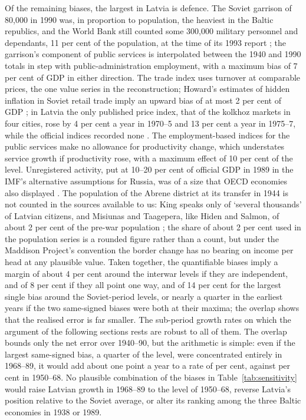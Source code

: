 Of the remaining biases, the largest in Latvia is defence. The Soviet garrison of 80,000 in 1990 was, in proportion to population, the heaviest in the Baltic republics, and the World Bank still counted some 300,000 military personnel and dependants, 11 per cent of the population, at the time of its 1993 report \parencite[157]{wbtransitionlatv}; the garrison's component of public services is interpolated between the 1940 and 1990 totals in step with public-administration employment, with a maximum bias of 7 per cent of GDP in either direction. The trade index uses turnover at comparable prices, the one value series in the reconstruction; Howard's estimates of hidden inflation in Soviet retail trade imply an upward bias of at most 2 per cent of GDP \parencites[607]{hidden_inflation_sov}[688--9]{kontorovich_2001}; in Latvia the only published price index, that of the kolkhoz markets in four cities, rose by 4 per cent a year in 1970--5 and 13 per cent a year in 1975--7, while the official indices recorded none \parencite[221]{years_of_dependence}. The employment-based indices for the public services make no allowance for productivity change, which understates service growth if productivity rose, with a maximum effect of 10 per cent of the level. Unregistered activity, put at 10--20 per cent of official GDP in 1989 in the IMF's alternative assumptions for Russia, was of a size that OECD economies also displayed \parencites[5]{baltictransitioncontraction}[90--1]{shadow_europe}. The population of the Abrene district at its transfer in 1944 is not counted in the sources available to us: King speaks only of `several thousands' of Latvian citizens, and Misiunas and Taagepera, like Hiden and Salmon, of about 2 per cent of the pre-war population \parencites[84]{king_1965_economic}[74]{years_of_dependence}[129--30]{hiden_salmon}; the share of about 2 per cent used in the population series is a rounded figure rather than a count, but under the Maddison Project's convention the border change has no bearing on income per head at any plausible value. Taken together, the quantifiable biases imply a margin of about 4 per cent around the interwar levels if they are independent, and of 8 per cent if they all point one way, and of 14 per cent for the largest single bias around the Soviet-period levels, or nearly a quarter in the earliest years if the two same-signed biases were both at their maxima; the overlap shows that the realised error is far smaller. The sub-period growth rates on which the argument of the following sections rests are robust to all of them. The overlap bounds only the net error over 1940--90, but the arithmetic is simple: even if the largest same-signed bias, a quarter of the level, were concentrated entirely in 1968--89, it would add about one point a year to a rate of  per cent, against  per cent in 1950--68. No plausible combination of the biases in Table~\ref{tab:sensitivity} would raise Latvian growth in 1968--89 to the level of 1950--68, reverse Latvia's position relative to the Soviet average, or alter its ranking among the three Baltic economies in 1938 or 1989.

